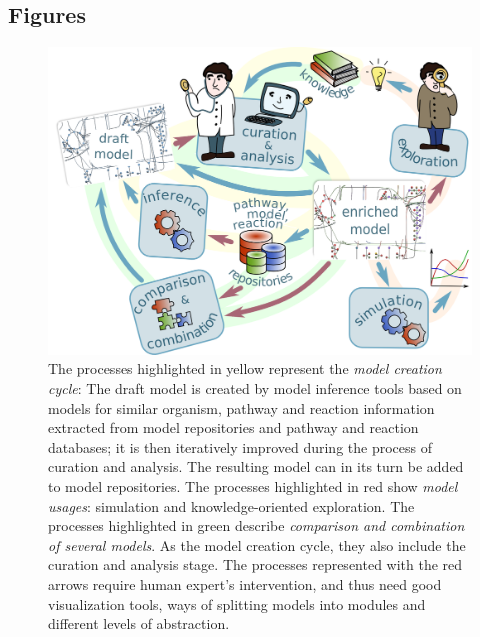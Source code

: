 \documentclass{bmcart}
\begin{document}
\begin{backmatter}


\section*{Figures}


\begin{figure}[h!]
\centering
\includegraphics[scale=0.6]{workflow.png}
\caption{ 
\label{fig:workflow}
The processes highlighted in yellow represent the \emph{model creation cycle}: The draft model is created by model inference tools based on models for similar organism, pathway and reaction information extracted from model repositories and pathway and reaction databases; it is then iteratively improved during the process of curation and analysis. The resulting model can in its turn be added to model repositories.
The processes highlighted in red show \emph{model usages}: simulation and knowledge-oriented exploration.
The processes highlighted in green describe \emph{comparison and combination of several models}. As the model creation cycle, they also include the curation and analysis stage.
The processes represented with the red arrows require human expert's intervention, and thus need good visualization tools, ways of splitting models into modules and different levels of abstraction.}
\end{figure}


\end{backmatter}
\end{document}
